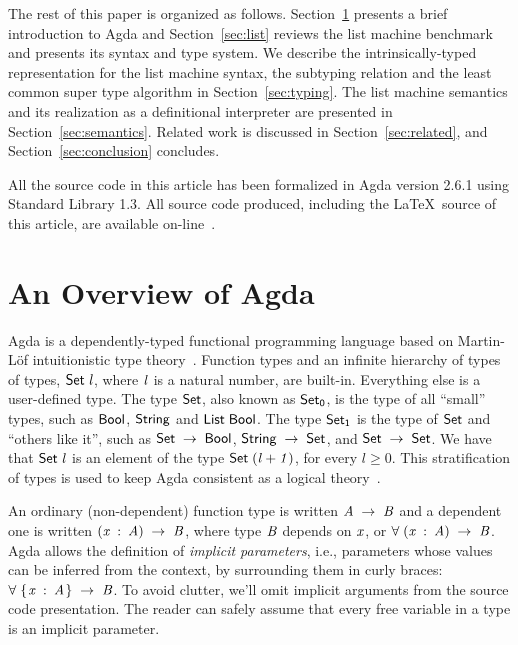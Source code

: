 \documentclass[sigconf]{acmart}
\theoremstyle{definition}
\renewcommand{\geq}{\geqslant}
\newcommand{\D}[1]{\blue{\mathsf{#1}}}
\newcommand{\V}[1]{\purple{\mathit{#1}}}
\begin{document}
The rest of this paper is organized as follows. Section~\ref{sec:agda}
presents a brief introduction to Agda and Section~\ref{sec:list}
reviews the list machine benchmark and presents its syntax and type system.
We describe the intrinsically-typed representation for the list machine syntax,
the subtyping relation and the least common super type algorithm in
Section~\ref{sec:typing}. The list machine semantics and its realization as
a definitional interpreter are presented in Section~\ref{sec:semantics}.
Related work is discussed in Section~\ref{sec:related},
and Section~\ref{sec:conclusion} concludes.

All the source code in this article has been formalized in Agda
version 2.6.1 using Standard Library 1.3. All source code produced,
including the \LaTeX~source of this article, are available
on-line~\cite{list-rep}.





\section{An Overview of Agda}\label{sec:agda}


Agda is a dependently-typed functional programming language based on
Martin-L\"of intuitionistic type theory~\cite{Lof98}.  Function types
and an infinite hierarchy of types of types, \ensuremath{\D{Set}\;\V{l}}, where \ensuremath{\V{l}} is a
natural number, are built-in. Everything else is a user-defined
type. The type \ensuremath{\D{Set}}, also known as \ensuremath{\D{Set}_{\D{0}}}, is the type of all
``small'' types, such as \ensuremath{\D{Bool}}, \ensuremath{\D{String}} and \ensuremath{\D{List}\;\D{Bool}}.  The type
\ensuremath{\D{Set}_{\D{1}}} is the type of \ensuremath{\D{Set}} and ``others like it'', such as \ensuremath{\D{Set}\;\to \;\D{Bool}}, \ensuremath{\D{String}\;\to \;\D{Set}}, and \ensuremath{\D{Set}\;\to \;\D{Set}}. We have that \ensuremath{\D{Set}\;\V{l}} is an
element of the type \ensuremath{\D{Set}\;(\V{l+1})}, for every $l \geq 0$. This
stratification of types is used to keep Agda consistent as a logical
theory~\cite{Sorensen2006}.

An ordinary (non-dependent) function type is written \ensuremath{\V{A}\;\to \;\V{B}} and a
dependent one is written \ensuremath{(\V{x}\;\mathbin{:}\;\V{A})\;\to \;\V{B}}, where type \ensuremath{\V{B}} depends on
\ensuremath{\V{x}}, or \ensuremath{\D{\forall}\;(\V{x}\;\mathbin{:}\;\V{A})\;\to \;\V{B}}. Agda allows the definition of \emph{implicit
parameters}, i.e.,  parameters whose values can be inferred from the
context, by surrounding them in curly braces: \ensuremath{\D{\forall}\;\{\mskip1.5mu \V{x}\;\mathbin{:}\;\V{A}\mskip1.5mu\}\;\to \;\V{B}}. To
avoid clutter, we'll omit implicit arguments from the source code
presentation. The reader can safely assume that every free variable in
a type is an implicit parameter.
\end{document}
